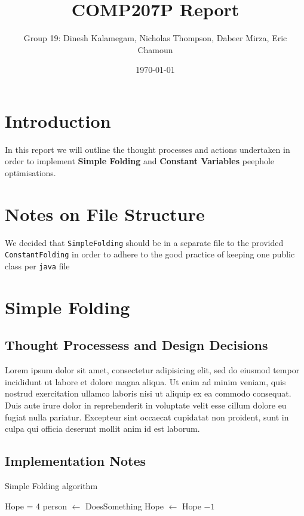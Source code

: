 \documentclass[11pt]{article}
\begin{document}
\title{COMP207P Report}
\author{Group 19: Dinesh Kalamegam, Nicholas Thompson, Dabeer Mirza, Eric Chamoun}
\date{\today}
\maketitle

\section{Introduction}
In this report we will outline the thought processes and actions undertaken in order to implement \textbf{Simple Folding} and \textbf{Constant Variables} peephole optimisations.

\section{Notes on File Structure}
We decided that \texttt{SimpleFolding} should be in a separate file to the provided \texttt{ConstantFolding} in order to adhere to the good practice of keeping one public class per \texttt{java} file

\section{Simple Folding}
\subsection{Thought Processess and Design Decisions}

Lorem ipsum dolor sit amet, consectetur adipisicing elit, sed do eiusmod tempor incididunt ut labore et dolore magna aliqua. Ut enim ad minim veniam, quis nostrud exercitation ullamco laboris nisi ut aliquip ex ea commodo consequat. Duis aute irure dolor in reprehenderit in voluptate velit esse cillum dolore eu fugiat nulla pariatur. Excepteur sint occaecat cupidatat non proident, sunt in culpa qui officia deserunt mollit anim id est laborum.

\subsection{Implementation Notes}
\begin{algorithm}[H]
\caption{Simple Folding algorithm}
\begin{algorithmic}[1]
    \State Hope = 4
    \State person $\gets$ DoesSomething
    \Else
    \State Hope $\gets$ Hope $-1$
    \EndIf
    \EndWhile
\end{algorithmic}
\end{algorithm}
\end{document}
